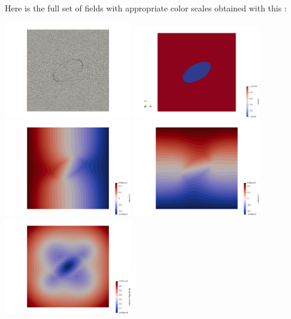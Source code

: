 \newpage
Here is the full set of fields with appropriate color scales obtained with 
this \stone:
\begin{center}
\includegraphics[width=5.57cm]{python_codes/fieldstone_142/results/case2/mesh}
\includegraphics[width=5.57cm]{python_codes/fieldstone_142/results/case2/eta}\\
\includegraphics[width=5.57cm]{python_codes/fieldstone_142/results/case2/u}
\includegraphics[width=5.57cm]{python_codes/fieldstone_142/results/case2/v}
\includegraphics[width=5.57cm]{python_codes/fieldstone_142/results/case2/vel}\\

\end{center}
